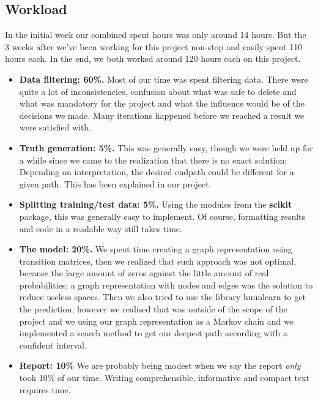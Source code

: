 \begin{appendices}

\section{Workload}\label{app:work}

In the initial week our combined spent hours was only around 14 hours. But the 3 weeks after we've been working for this project non-stop and easily spent 110 hours each. In the end, we both worked around 120 hours each on this project.
\begin{itemize}
	\item \textbf{Data filtering: 60\%.} Most of our time was spent filtering data. There were quite a lot of inconsistencies, confusion about what was safe to delete and what was mandatory for the project and what the influence would be of the decisions we made. Many iterations happened before we reached a result we were satisfied with.
	\item \textbf{Truth generation: 5\%.} This was generally easy, though we were held up for a while since we came to the realization that there is no exact solution: Depending on interpretation, the desired endpath could be different for a given path. This has been explained in our project.
	\item \textbf{Splitting training/test data: 5\%.} Using the modules from the \textbf{scikit} package, this was generally easy to implement. Of course, formatting results and code in a readable way still takes time.
	\item \textbf{The model: 20\%.} We spent time creating a graph representation using transition matrices, then we realized that such approach was not optimal, because the large amount of zeros against the little amount of real probabilities; a graph representation with nodes and edges was the solution to reduce useless spaces. Then we also tried to use the library hmmlearn to get the prediction, however we realised that was outside of the scope of the project and we using our graph representation as a Markov chain and we implemented a search method to get our deepest path according with a confident interval.
	\item \textbf{Report: 10\%} We are probably being modest when we say the report \textit{only} took 10\% of our time. Writing comprehensible, informative and compact text requires time.
\end{itemize} 

\end{appendices}